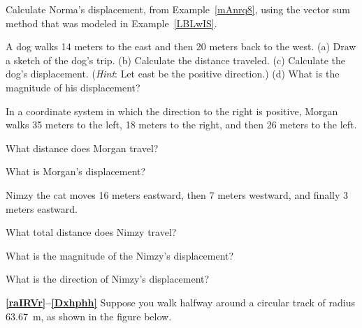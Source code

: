 \documentclass[main.tex]{subfiles}
\begin{document}
\begin{exercise}
    Calculate Norma's displacement, from Example~\ref{mAnrq8}, using the vector sum method that was modeled in Example~\ref{LBLwIS}.
\end{exercise}

\begin{exercise} \label{xs4oMq}
A dog walks 14 meters to the east and then 20 meters back to the west.  (a) Draw a sketch of the dog's trip. (b) Calculate the distance traveled. (c) Calculate the dog's displacement. (\textit{Hint}: Let east be the positive direction.) (d) What is the magnitude of his displacement?
\end{exercise}


\cyanhrule

\vspace{1em}

In a coordinate system in which the direction to the right is positive, Morgan walks 35 meters to the left, 18 meters to the right, and then 26 meters to the left.

\begin{exercise} \label{3rT1wE}
What distance does Morgan travel?
\end{exercise}

\begin{exercise} \label{0NkeX1}
What is Morgan's displacement?
\end{exercise}

\cyanhrule

\vspace{1em}

Nimzy the cat moves 16 meters eastward, then 7 meters westward, and finally 3 meters eastward.

\begin{exercise} \label{umzXid}
    What total distance does Nimzy travel?
\end{exercise}

\begin{exercise} \label{CO3yuB}
    What is the magnitude of the Nimzy's displacement?
\end{exercise}

\begin{exercise} \label{2O3f3z}
    What is the direction of Nimzy's displacement?
\end{exercise}

\cyanhrule

\vspace{1em}

\textbf{\ref{raIRVr}--\ref{Dxhphh}} Suppose you walk halfway around a circular track of radius \SI{63.67}{m}, as shown in the figure below.
\end{document}
